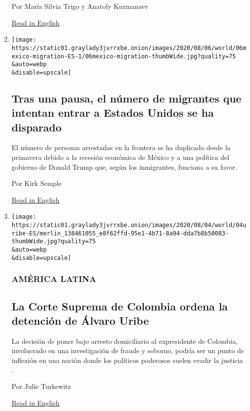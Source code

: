 \begin{enumerate}
  Por María Silvia Trigo y Anatoly Kurmanaev

  \href{https://www.nytimes3xbfgragh.onion/2020/08/07/world/americas/bolivia-roadblock-blockade.html}{Read
  in English}
\item
  \href{/es/2020/08/06/espanol/america-latina/migracion-estados-unidos.html}{}

  \texttt{[image: https://static01.graylady3jvrrxbe.onion/images/2020/08/06/world/06mexico-migration-ES-1/06mexico-migration-thumbWide.jpg?quality=75\\\&auto=webp\\\&disable=upscale]}

  \hypertarget{tras-una-pausa-el-nuxfamero-de-migrantes-que-intentan-entrar-a-estados-unidos-se-ha-disparado}{%
  \subsection{Tras una pausa, el número de migrantes que intentan entrar
  a Estados Unidos se ha
  disparado}\label{tras-una-pausa-el-nuxfamero-de-migrantes-que-intentan-entrar-a-estados-unidos-se-ha-disparado}}

  El número de personas arrestadas en la frontera se ha duplicado desde
  la primavera debido a la recesión económica de México y a una política
  del gobierno de Donald Trump que, según los inmigrantes, funciona a su
  favor.

  Por Kirk Semple

  \href{https://www.nytimes3xbfgragh.onion/2020/08/06/world/americas/mexico-immigration-usa.html}{Read
  in English}
\item
  \href{/es/2020/08/04/espanol/america-latina/alvaro-uribe-detencion-colombia.html}{}

  \texttt{[image: https://static01.graylady3jvrrxbe.onion/images/2020/08/04/world/04uribe-ES/merlin\_138461055\_e8f62ffd-95e1-4b71-8a94-dda7b8b50083-thumbWide.jpg?quality=75\\\&auto=webp\\\&disable=upscale]}

  \hypertarget{amuxe9rica-latina-4}{%
  \subsubsection{AMÉRICA LATINA}\label{amuxe9rica-latina-4}}

  \hypertarget{la-corte-suprema-de-colombia-ordena-la-detenciuxf3n-de-uxe1lvaro-uribe}{%
  \subsection{La Corte Suprema de Colombia ordena la detención de Álvaro
  Uribe}\label{la-corte-suprema-de-colombia-ordena-la-detenciuxf3n-de-uxe1lvaro-uribe}}

  La decisión de poner bajo arresto domiciliario al expresidente de
  Colombia, involucrado en una investigación de fraude y soborno, podría
  ser un punto de inflexión en una nación donde los políticos poderosos
  suelen evadir la justicia .

  Por Julie Turkewitz

  \href{https://www.nytimes3xbfgragh.onion/2020/08/04/world/americas/colombia-president-uribe-charged.html}{Read
  in English}
\end{enumerate}

